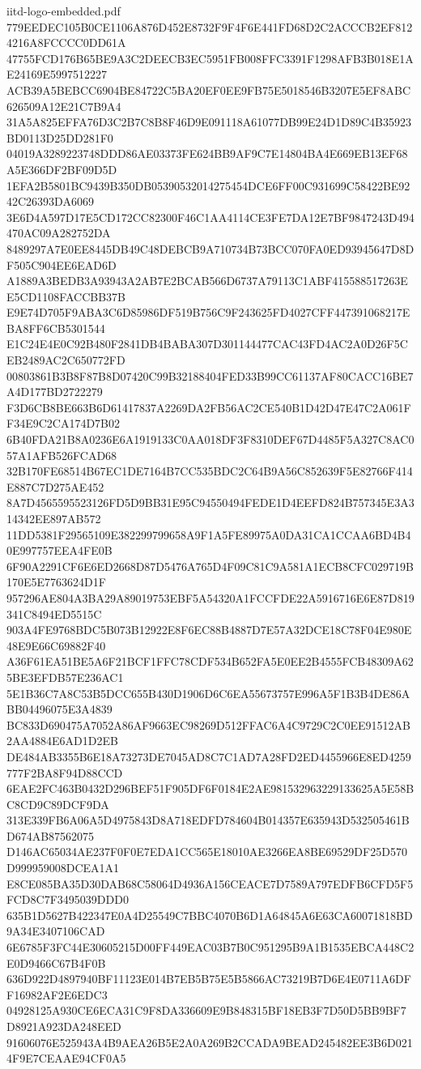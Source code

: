 \begin{filecontents*}[overwrite]{iitd-logo-embedded.pdf}
779EEDEC105B0CE1106A876D452E8732F9F4F6E441FD68D2C2ACCCB2EF8124216A8FCCCC0DD61A
47755FCD176B65BE9A3C2DEECB3EC5951FB008FFC3391F1298AFB3B018E1AE24169E5997512227
ACB39A5BEBCC6904BE84722C5BA20EF0EE9FB75E5018546B3207E5EF8ABC626509A12E21C7B9A4
31A5A825EFFA76D3C2B7C8B8F46D9E091118A61077DB99E24D1D89C4B35923BD0113D25DD281F0
04019A3289223748DDD86AE03373FE624BB9AF9C7E14804BA4E669EB13EF68A5E366DF2BF09D5D
1EFA2B5801BC9439B350DB05390532014275454DCE6FF00C931699C58422BE9242C26393DA6069
3E6D4A597D17E5CD172CC82300F46C1AA4114CE3FE7DA12E7BF9847243D494470AC09A282752DA
8489297A7E0EE8445DB49C48DEBCB9A710734B73BCC070FA0ED93945647D8DF505C904EE6EAD6D
A1889A3BEDB3A93943A2AB7E2BCAB566D6737A79113C1ABF415588517263EE5CD1108FACCBB37B
E9E74D705F9ABA3C6D85986DF519B756C9F243625FD4027CFF447391068217EBA8FF6CB5301544
E1C24E4E0C92B480F2841DB4BABA307D301144477CAC43FD4AC2A0D26F5CEB2489AC2C650772FD
00803861B3B8F87B8D07420C99B32188404FED33B99CC61137AF80CACC16BE7A4D177BD2722279
F3D6CB8BE663B6D61417837A2269DA2FB56AC2CE540B1D42D47E47C2A061FF34E9C2CA174D7B02
6B40FDA21B8A0236E6A1919133C0AA018DF3F8310DEF67D4485F5A327C8AC057A1AFB526FCAD68
32B170FE68514B67EC1DE7164B7CC535BDC2C64B9A56C852639F5E82766F414E887C7D275AE452
8A7D4565595523126FD5D9BB31E95C94550494FEDE1D4EEFD824B757345E3A314342EE897AB572
11DD5381F29565109E382299799658A9F1A5FE89975A0DA31CA1CCAA6BD4B40E997757EEA4FE0B
6F90A2291CF6E6ED2668D87D5476A765D4F09C81C9A581A1ECB8CFC029719B170E5E7763624D1F
957296AE804A3BA29A89019753EBF5A54320A1FCCFDE22A5916716E6E87D819341C8494ED5515C
903A4FE9768BDC5B073B12922E8F6EC88B4887D7E57A32DCE18C78F04E980E48E9E66C69882F40
A36F61EA51BE5A6F21BCF1FFC78CDF534B652FA5E0EE2B4555FCB48309A625BE3EFDB57E236AC1
5E1B36C7A8C53B5DCC655B430D1906D6C6EA55673757E996A5F1B3B4DE86ABB04496075E3A4839
BC833D690475A7052A86AF9663EC98269D512FFAC6A4C9729C2C0EE91512AB2AA4884E6AD1D2EB
DE484AB3355B6E18A73273DE7045AD8C7C1AD7A28FD2ED4455966E8ED4259777F2BA8F94D88CCD
6EAE2FC463B0432D296BEF51F905DF6F0184E2AE981532963229133625A5E58BC8CD9C89DCF9DA
313E339FB6A06A5D4975843D8A718EDFD784604B014357E635943D532505461BD674AB87562075
D146AC65034AE237F0F0E7EDA1CC565E18010AE3266EA8BE69529DF25D570D999959008DCEA1A1
E8CE085BA35D30DAB68C58064D4936A156CEACE7D7589A797EDFB6CFD5F5FCD8C7F3495039DDD0
635B1D5627B422347E0A4D25549C7BBC4070B6D1A64845A6E63CA60071818BD9A34E3407106CAD
6E6785F3FC44E30605215D00FF449EAC03B7B0C951295B9A1B1535EBCA448C2E0D9466C67B4F0B
636D922D4897940BF11123E014B7EB5B75E5B5866AC73219B7D6E4E0711A6DFF16982AF2E6EDC3
04928125A930CE6ECA31C9F8DA336609E9B848315BF18EB3F7D50D5BB9BF7D8921A923DA248EED
91606076E525943A4B9AEA26B5E2A0A269B2CCADA9BEAD245482EE3B6D0214F9E7CEAAE94CF0A5

\end{filecontents*}
